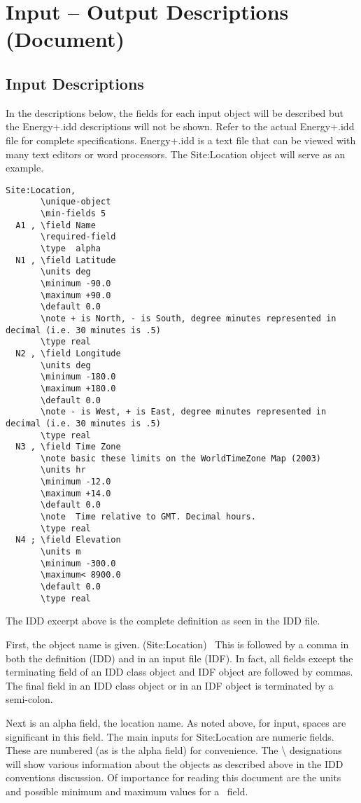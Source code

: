 \section{Input -- Output Descriptions (Document)}\label{input-output-descriptions-document}

\subsection{Input Descriptions}\label{input-descriptions}

In the descriptions below, the fields for each input object will be described but the Energy+.idd descriptions will not be shown. Refer to the actual Energy+.idd file for complete specifications. Energy+.idd is a text file that can be viewed with many text editors or word processors. The Site:Location object will serve as an example.

\begin{lstlisting}
Site:Location,
       \unique-object
       \min-fields 5
  A1 , \field Name
       \required-field
       \type  alpha
  N1 , \field Latitude
       \units deg
       \minimum -90.0
       \maximum +90.0
       \default 0.0
       \note + is North, - is South, degree minutes represented in decimal (i.e. 30 minutes is .5)
       \type real
  N2 , \field Longitude
       \units deg
       \minimum -180.0
       \maximum +180.0
       \default 0.0
       \note - is West, + is East, degree minutes represented in decimal (i.e. 30 minutes is .5)
       \type real
  N3 , \field Time Zone
       \note basic these limits on the WorldTimeZone Map (2003)
       \units hr
       \minimum -12.0
       \maximum +14.0
       \default 0.0
       \note  Time relative to GMT. Decimal hours.
       \type real
  N4 ; \field Elevation
       \units m
       \minimum -300.0
       \maximum< 8900.0
       \default 0.0
       \type real
\end{lstlisting}

The IDD excerpt above is the complete definition as seen in the IDD file.

First, the object name is given. (Site:Location)~ This is followed by a comma in both the definition (IDD) and in an input file (IDF). In fact, all fields except the terminating field of an IDD class object and IDF object are followed by commas. The final field in an IDD class object or in an IDF object is terminated by a semi-colon.

Next is an alpha field, the location name. As noted above, for input, spaces are significant in this field. The main inputs for Site:Location are numeric fields. These are numbered (as is the alpha field) for convenience. The \textbackslash{} designations will show various information about the objects as described above in the IDD conventions discussion. Of importance for reading this document are the units and possible minimum and maximum values for a~ field.

